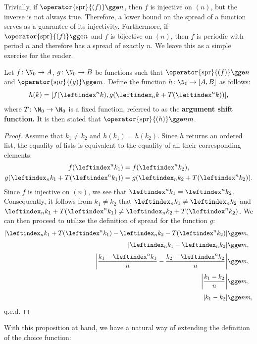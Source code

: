 \documentclass[12pt, a4paper]{article}
\newcommand{\spr}[1]{\operator{\mathrm{spr}}{\left(#1\right)}}
\newcommand{\lli}[1]{\leftindex_{#1}}
\newcommand{\lui}[1]{\leftindex^{#1}}
\begin{document}
Trivially, if $ \spr{f} \gge n $, then $ f $ is injective on $ (n) $, but the inverse is not always true. Therefore, a lower bound on the spread of a function serves as a guarantee of its injectivity. Furthermore, if $ \spr{f} \gge n $ and $ f $ is bijective on $ (n) $, then $ f $ is periodic with period $ n $ and therefore has a spread of exactly $ n $. We leave this as a simple exercise for the reader.

\begin{proposition}\label{map}
    Let $ f \colon \N_0 \to A $, $ g \colon \N_0 \to B $ be functions such that $ \spr{f} \gge n $ and $ \spr{g} \gge m $. Define the function $ h \colon \N_0 \to [A, B] $ as follows:
    \[ h(k) = [f(\lui{n}k), g(\lli{n}k + T(\lui{n}k))], \]
    where $ T \colon \N_0 \to \N_0 $ is a fixed function, referred to as the \textbf{argument shift function.} It is then stated that $ \spr{h} \gge nm $.
\end{proposition}
\begin{proof}
    Assume that $ k_1 \ne k_2 $ and $ h(k_1) = h(k_2) $. Since $ h $ returns an ordered list, the equality of lists is equivalent to the equality of all their corresponding elements:
    \begin{gather*}
        f(\lui{n}k_1) = f(\lui{n}k_2),\label{one}\\
        g(\lli{n}k_1 + T(\lui{n}k_1)) = g(\lli{n}k_2 + T(\lui{n}k_2)).\label{two}
    \end{gather*}
    Since $ f $ is injective on $ (n) $, we see that $ \lui{n}k_1 = \lui{n}k_2 $. Consequently, it follows from $ k_1 \ne k_2 $ that $ \lli{n}k_1 \ne \lli{n}k_2 $ and $ \lli{n}k_1 + T(\lui{n}k_1) \ne \lli{n}k_2 + T(\lui{n}k_2) $. We can then proceed to utilize the definition of spread for the function $ g $:
    \begin{align*}
    | \lli{n}k_1 + T(\lui{n}k_1) - \lli{n}k_2 - T(\lui{n}k_2) | &\gge m,\\[1mm]
    | \lli{n}k_1 - \lli{n}k_2 | &\gge m,\\[1mm]
    \left| \frac{k_1 - \lui{n}k_1}{n} - \frac{k_2 - \lui{n}k_2}{n} \right| &\gge m,\\[1mm]
    \left| \frac{k_1 - k_2}{n} \right| &\gge m,\\[1mm]
    | k_1 - k_2 | &\gge nm,
    \end{align*}
    q.e.d.
\end{proof}

With this proposition at hand, we have a natural way of extending the definition of the choice function:
\end{document}
